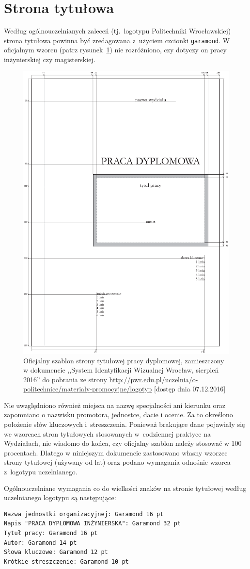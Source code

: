 \section{Strona tytułowa}
Według ogólnouczelnianych zaleceń (tj.\ logotypu Politechniki Wrocławskiej) strona tytułowa powinna być zredagowana z~użyciem czcionki \texttt{garamond}. W oficjalnym wzorcu (patrz rysunek~\ref{fig:stronaTytulowa})
nie rozróżniono, czy dotyczy on pracy inżynierskiej czy magisterskiej.
\begin{figure}[b]
	\centering
	\includegraphics[width=.6\linewidth]{rys03/stronaTytulowa01}
	\caption{Oficjalny szablon strony tytułowej pracy dyplomowej, zamieszczony w dokumencie ,,System
		Identyfikacji Wizualnej Wrocław, sierpień 2016'' do pobrania ze strony \url{http://pwr.edu.pl/uczelnia/o-politechnice/materialy-promocyjne/logotyp} [dostęp dnia 07.12.2016]}
	\label{fig:stronaTytulowa}
\end{figure}
Nie uwzględniono również miejsca na nazwę specjalności ani kierunku oraz zapomniano o nazwisku promotora, jednostce, dacie i ocenie.  Za to określono  położenie słów kluczowych i~streszczenia. Ponieważ brakujące dane pojawiały się we wzorcach stron tytułowych stosowanych w~codziennej praktyce na Wydziałach, nie wiadomo do końca, czy oficjalny szablon należy stosować w 100 procentach. Dlatego w niniejszym dokumencie zastosowano własny wzorzec strony tytułowej (używany od lat) oraz podano wymagania odnośnie wzorca z~logotypu uczelnianego.

Ogólnouczelniane wymagania co do wielkości znaków na stronie tytułowej według uczelnianego logotypu są następujące:
\begin{lstlisting}[basicstyle=\footnotesize\ttfamily]
Nazwa jednostki organizacyjnej: Garamond 16 pt
Napis "PRACA DYPLOMOWA INŻYNIERSKA": Garamond 32 pt
Tytuł pracy: Garamond 16 pt
Autor: Garamond 14 pt
Słowa kluczowe: Garamond 12 pt
Krótkie streszczenie: Garamond 10 pt
\end{lstlisting}

